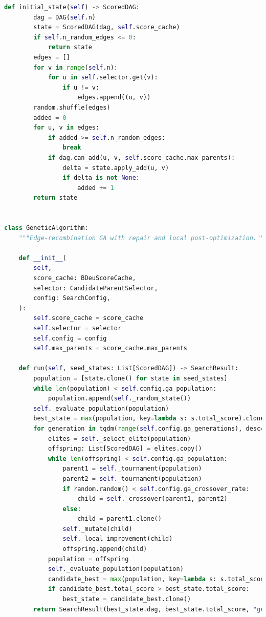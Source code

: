 \documentclass[twoside,11pt]{article}
\begin{document}
\begin{algorithm}
\begin{lstlisting}[language=Python]
    def initial_state(self) -> ScoredDAG:
        dag = DAG(self.n)
        state = ScoredDAG(dag, self.score_cache)
        if self.n_random_edges <= 0:
            return state
        edges = []
        for v in range(self.n):
            for u in self.selector.get(v):
                if u != v:
                    edges.append((u, v))
        random.shuffle(edges)
        added = 0
        for u, v in edges:
            if added >= self.n_random_edges:
                break
            if dag.can_add(u, v, self.score_cache.max_parents):
                delta = state.apply_add(u, v)
                if delta is not None:
                    added += 1
        return state


class GeneticAlgorithm:
    """Edge-recombination GA with repair and local post-optimization."""

    def __init__(
        self,
        score_cache: BDeuScoreCache,
        selector: CandidateParentSelector,
        config: SearchConfig,
    ):
        self.score_cache = score_cache
        self.selector = selector
        self.config = config
        self.max_parents = score_cache.max_parents

    def run(self, seed_states: List[ScoredDAG]) -> SearchResult:
        population = [state.clone() for state in seed_states]
        while len(population) < self.config.ga_population:
            population.append(self._random_state())
        self._evaluate_population(population)
        best_state = max(population, key=lambda s: s.total_score).clone()
        for generation in tqdm(range(self.config.ga_generations), desc="Genetic Algorithm", unit="gen"):
            elites = self._select_elite(population)
            offspring: List[ScoredDAG] = elites.copy()
            while len(offspring) < self.config.ga_population:
                parent1 = self._tournament(population)
                parent2 = self._tournament(population)
                if random.random() < self.config.ga_crossover_rate:
                    child = self._crossover(parent1, parent2)
                else:
                    child = parent1.clone()
                self._mutate(child)
                self._local_improvement(child)
                offspring.append(child)
            population = offspring
            self._evaluate_population(population)
            candidate_best = max(population, key=lambda s: s.total_score)
            if candidate_best.total_score > best_state.total_score:
                best_state = candidate_best.clone()
        return SearchResult(best_state.dag, best_state.total_score, "genetic", {"generations": self.config.ga_generations})


\end{lstlisting}
\end{algorithm}
\end{document}
